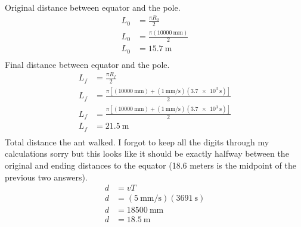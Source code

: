 \documentclass{homework}
\begin{document}
Original distance between equator and the pole.
\begin{align*}
    L_0	&=	\frac{\pi R_0}{2}	\\
    L_0	&=	\frac{\pi (\SI{10000}{\milli\metre})}{2}	\\
    L_0	&=	\boxed{\SI{15.7}{\metre}}	\\
\end{align*}
Final distance between equator and the pole.
\begin{align*}
    L_f	&=	\frac{\pi R_f}{2}	\\
    L_f	&=	\frac{\pi [(\SI{10000}{\milli\metre}) + (\SI{1}{\milli\metre/\second})(\SI{3.7e3}{\second})]}{2}	\\
    L_f	&=	\frac{\pi [(\SI{10000}{\milli\metre}) + (\SI{1}{\milli\metre/\second})(\SI{3.7e3}{\second})]}{2}	\\
    L_f	&=	\boxed{\SI{21.5}{\metre}}	\\
\end{align*}
Total distance the ant walked. I forgot to keep all the digits through my calculations sorry but this looks like it should be exactly halfway between the original and ending distances to the equator (18.6 meters is the midpoint of the previous two answers).
\begin{align*}
    d	&=	vT	\\
    d	&=	(\SI{5}{\milli\metre/\second})(\SI{3691}{\second})	\\
    d   &=  \SI{18500}{\milli\metre}    \\
    d   &=  \boxed{\SI{18.5}{\metre}}
\end{align*}
\end{document}
